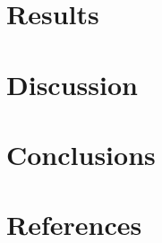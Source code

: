 \documentclass[hidelinks, 12pt]{article} %
\begin{document}
\section{Results}





\section{Discussion}




\section{Conclusions}


\section*{References}
\end{document}
